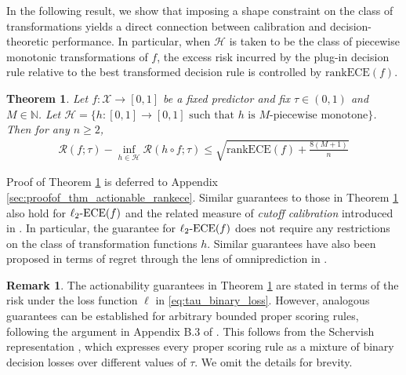 \documentclass[11pt]{article}
\numberwithin{equation}{section}
\newtheorem{theorem}{Theorem}[section]
\theoremstyle{definition}
\newtheorem{remark}{Remark}[section]
\newcommand{\N}{\mathbb{N}}
\newcommand{\cH}{\mathcal{H}}
\newcommand{\cR}{\mathcal{R}}
\newcommand{\cX}{\mathcal{X}}
\newcommand{\ra}{\rightarrow}
\newcommand{\ECE}{\mathrm{ECE}}
\newcommand{\lECE}{\ell_2\textnormal{-}\ECE}
\newcommand{\rankECE}{\mathrm{rankECE}}
\begin{document}
In the following result, we show that imposing a shape constraint on the class of transformations yields a direct connection between calibration and decision-theoretic performance. In particular, when $\cH$ is taken to be the class of piecewise monotonic transformations of $f$, the excess risk incurred by the plug-in decision rule relative to the best transformed decision rule is controlled by $\rankECE(f)$.

\begin{theorem}\label{thm:actionable_rankece}
    Let $f:\cX\ra[0,1]$ be a fixed predictor and fix $\tau\in (0,1)$ and $M\in \N$. Let $\cH = \{h:[0,1]\ra[0,1]\text{ such that }h\text{ is $M$-piecewise monotone}\}$. Then for any $n\geq 2$,
    \begin{align*}
        \cR(f;\tau) - \inf_{h\in \cH}\cR(h\circ f;\tau)\leq \sqrt{\rankECE(f) + \frac{8(M+1)}{n}}
    \end{align*} 
\end{theorem}

Proof of Theorem \ref{thm:actionable_rankece} is deferred to Appendix \ref{sec:proofof_thm_actionable_rankece}. Similar guarantees to those in Theorem \ref{thm:actionable_rankece} also hold for $\lECE(f)$ and the related measure of \textit{cutoff calibration} introduced in \citep{rossellini2025can}. In particular, the guarantee for $\lECE(f)$ does not require any restrictions on the class of transformation functions $h$. Similar guarantees have also been proposed in terms of regret through the lens of omniprediction in \cite{okoroafor2025nearoptimal}.

\begin{remark}
    The actionability guarantees in Theorem \ref{thm:actionable_rankece} are stated in terms of the risk under the loss function $\ell$ in \eqref{eq:tau_binary_loss}. However, analogous guarantees can be established for arbitrary bounded proper scoring rules, following the argument in Appendix B.3 of \cite{rossellini2025can}. This follows from the Schervish representation \citep{schervish1989general}, which expresses every proper scoring rule as a mixture of binary decision losses over different values of $\tau$. We omit the details for brevity.
\end{remark}
\end{document}
